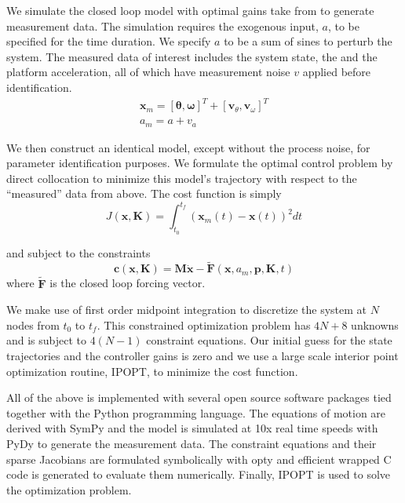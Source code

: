 \documentclass[11pt,a4paper,twocolumn]{article}
\begin{document}
We simulate the closed loop model with optimal gains take from \cite{Park2004}
to generate measurement data. The simulation requires the exogenous input, $a$,
to be specified for the time duration. We specify $a$ to be a sum of sines to
perturb the system. The measured data of interest includes the system state,
the and the platform acceleration, all of which have measurement noise $v$
applied before identification.
%
\begin{align}
  \mathbf{x}_m = [\mathbf{\theta}, \mathbf{\omega}]^T + [\mathbf{v}_\theta,
  \mathbf{v}_\omega]^T \\
  a_m = a + v_a
\end{align}

We then construct an identical model, except without the process noise, for
parameter identification purposes. We formulate the optimal control problem by
direct collocation to minimize this model's trajectory with respect to the
``measured'' data from above. The cost function is simply
%
\begin{equation}
  J(\mathbf{x}, \mathbf{K}) = \int_{t_0}^{t_f}(\mathbf{x}_m(t) - \mathbf{x}(t))^2 dt
\end{equation}

and subject to the constraints
%
\begin{equation}
  \mathbf{c}(\mathbf{x}, \mathbf{K}) = \mathbf{M} \dot{\mathbf{x}} -
  \tilde{\mathbf{F}}(\mathbf{x},
  a_m, \mathbf{p}, \mathbf{K}, t)
\end{equation}
%
where $\tilde{\mathbf{F}}$ is the closed loop forcing vector.

We make use of first order midpoint integration to discretize the system at $N$
nodes from $t_0$ to $t_f$. This constrained optimization problem has $4N + 8$
unknowns and is subject to $4(N-1)$ constraint equations. Our initial guess for
the state trajectories and the controller gains is zero and we use a large
scale interior point optimization routine, IPOPT, to minimize the cost
function.

All of the above is implemented with several open source software packages tied
together with the Python programming language. The equations of motion are
derived with SymPy and the model is simulated at 10x real time speeds with PyDy
to generate the measurement data. The constraint equations and their sparse
Jacobians are formulated symbolically with opty and efficient wrapped C code is
generated to evaluate them numerically. Finally, IPOPT is used to solve the
optimization problem.
\end{document}
